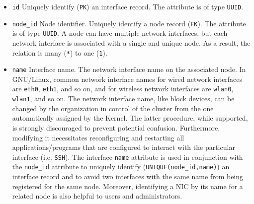 \begin{itemize}
  \item \texttt{id}
    \newline
    Uniquely identify (\texttt{PK}) an interface record.
    \newline
    The attribute is of type \texttt{UUID}.

  \item \texttt{node\_id}
    \newline
    Node identifier.
    \newline
    Uniquely identify a node record (\texttt{FK}).
    \newline
    The attribute is of type \texttt{UUID}.
    \newline
    A node can have multiple network interfaces, but each network interface is
    associated with a single and unique node. As a result, the relation is many
    (\texttt{*}) to one (\texttt{1}).

  \item \texttt{name}
    \newline
    Interface name.
    \newline
    The network interface name on the associated node. In GNU/Linux, common network
    interface names for wired network interfaces are \texttt{eth0}, \texttt{eth1},
    and so on, and for wireless network interfaces are \texttt{wlan0}, \texttt{wlan1},
    and so on. The network interface name, like block devices, can be changed by
    the organization in control of the cluster from the one automatically assigned
    by the Kernel. The latter procedure, while supported, is strongly
    discouraged to prevent potential confusion. Furthermore, modifying it
    necessitates reconfiguring and restarting all applications/programs that are
    configured to interact with the particular interface (i.e. \texttt{SSH}).
    \newline
    The interface \texttt{name} attribute is used in conjunction with the
    \texttt{node\_id} attribute to uniquely identify (\texttt{UNIQUE(node\_id,name)})
    an interface record and to avoid two interfaces with the same name from being
    registered for the same node. Moreover, identifying a NIC by its name for a related
    node is also helpful to users and administrators.


\end{itemize}
